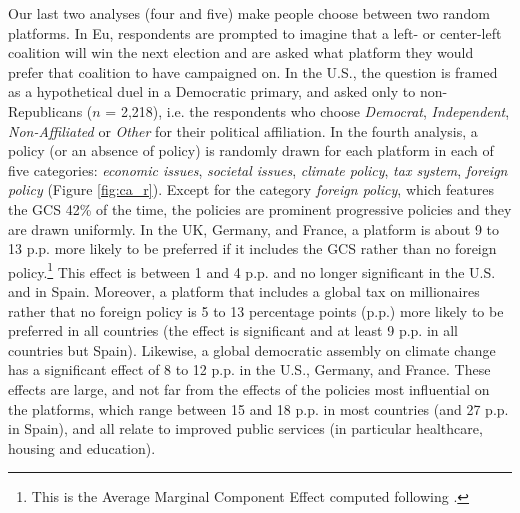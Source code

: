 Our last two analyses (four and five) make people choose between two random platforms. In Eu, respondents are prompted to imagine that a left- or center-left coalition will win the next election and are asked what platform they would prefer that coalition to have campaigned on. In the U.S., the question is framed as a hypothetical duel in a Democratic primary, and asked only to non-Republicans ($n$ = 2,218), i.e. the respondents who choose \textit{Democrat}, \textit{Independent}, \textit{Non-Affiliated} or \textit{Other} for their political affiliation. In the fourth analysis, a policy (or an absence of policy) is randomly drawn for each platform in each of five categories: \textit{economic issues}, \textit{societal issues}, \textit{climate policy}, \textit{tax system}, \textit{foreign policy} (Figure \ref{fig:ca_r}). 
Except for the category \textit{foreign policy}, which features the GCS 42\% of the time, the policies are prominent progressive policies and they are drawn uniformly. %
In the UK, Germany, and France, a platform is about 9 to 13 p.p. more likely to be preferred if it includes the GCS rather than no foreign policy.\footnote{This is the Average Marginal Component Effect computed following \citet{hainmueller_causal_2014}.} This effect is between 1 and 4 p.p. and no longer significant in the U.S. and in Spain. 
Moreover, a platform that includes a global tax on millionaires rather that no foreign policy is 5 to 13 percentage points (p.p.) more likely to be preferred in all countries (the effect is significant and at least 9 p.p. in all countries but Spain). 
Likewise, a global democratic assembly on climate change has a significant effect of 8 to 12 p.p. in the U.S., Germany, and France. 
These effects are large, and not far from the effects of the policies most influential on the platforms, which range between 15 and 18 p.p. in most countries (and 27 p.p. in Spain), and all relate to improved public services (in particular healthcare, housing and education). 

